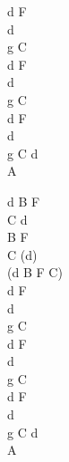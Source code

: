 \documentclass[a5paper, 10pt]{book}
\begin{document}
\begin{minipage}[t]{0.2\textwidth}
 d F\\
 d\\
 g C\\
  d F\\
 d\\
 g C\\
  d F\\
 d\\
 g C  d\\
 A\vspace*{1.9mm}

d B F\\
C d\\
 B F\\
 C (d)\\
(d B F C)\\
 d F\\
 d\\
 g C\\
  d F\\
 d\\
 g C\\
  d F\\
 d\\
 g C  d\\
 A\\
\end{minipage}

\newpage
\end{document}
